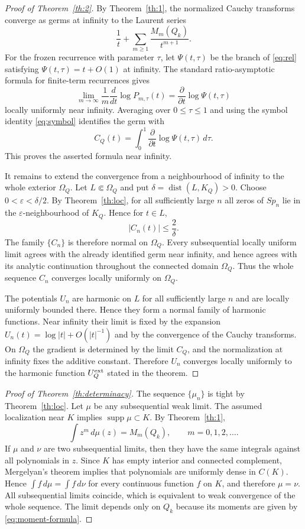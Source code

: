 \documentclass[10pt,twoside,a4paper,reqno]{amsart}
\theoremstyle{plain}
\theoremstyle{definition}
\theoremstyle{remark}
\begin{document}
\begin{proof}[Proof of Theorem~\ref{th:2}]
By Theorem~\ref{th:1}, the normalized Cauchy transforms converge as germs at
infinity to the Laurent series
\[
        \frac1t+\sum_{m\ge1}\frac{M_m(Q_k)}{t^{m+1}}.
\]
For the frozen recurrence with parameter $\tau$, let $\Psi(t,\tau)$ be the
branch of \eqref{eq:rel} satisfying $\Psi(t,\tau)=t+O(1)$ at infinity.  The
standard ratio-asymptotic formula for finite-term recurrences gives
\[
        \lim_{m\to\infty}\frac1m\frac{d}{dt}\log P_{m,\tau}(t)
        =\frac{\partial}{\partial t}\log\Psi(t,\tau)
\]
locally uniformly near infinity.  Averaging over $0\le\tau\le1$ and using the
symbol identity \eqref{eq:symbol} identifies the germ with
\[
        C_Q(t)=\int_0^1\frac{\partial}{\partial t}\log\Psi(t,\tau)\,d\tau .
\]
This proves the asserted formula near infinity.

It remains to extend the convergence from a neighbourhood of infinity to the
whole exterior $\Omega_Q$.  Let $L\Subset\Omega_Q$ and put
$\delta=\operatorname{dist}(L,K_Q)>0$.  Choose
$0<\varepsilon<\delta/2$.  By Theorem~\ref{th:loc}, for all sufficiently large
$n$ all zeros of $Sp_n$ lie in the $\varepsilon$-neighbourhood of $K_Q$.  Hence
for $t\in L$,
\[
        |C_n(t)|\le \frac{2}{\delta} .
\]
The family $\{C_n\}$ is therefore normal on $\Omega_Q$.  Every subsequential
locally uniform limit agrees with the already identified germ near infinity, and
hence agrees with its analytic continuation throughout the connected domain
$\Omega_Q$.  Thus the whole sequence $C_n$ converges locally uniformly on
$\Omega_Q$.

The potentials $U_n$ are harmonic on $L$ for all sufficiently large $n$ and are
locally uniformly bounded there.  Hence they form a normal family of harmonic
functions.  Near infinity their limit is fixed by the expansion
$U_n(t)=\log|t|+O(|t|^{-1})$ and by the convergence of the Cauchy transforms.
On $\Omega_Q$ the gradient is determined by the limit $C_Q$, and the
normalization at infinity fixes the additive constant.  Therefore $U_n$ converges
locally uniformly to the harmonic function $U_Q^{\rm ext}$ stated in the theorem.
\end{proof}

\begin{proof}[Proof of Theorem~\ref{th:determinacy}]
The sequence $\{\mu_n\}$ is tight by Theorem~\ref{th:loc}.  Let $\mu$ be any
subsequential weak limit.  The assumed localization near $K$ implies
$\operatorname{supp}\mu\subset K$.  By Theorem~\ref{th:1},
\[
        \int z^m\,d\mu(z)=M_m(Q_k),\qquad m=0,1,2,\ldots .
\]
If $\mu$ and $\nu$ are two subsequential limits, then they have the same
integrals against all polynomials in $z$.  Since $K$ has empty interior and
connected complement, Mergelyan's theorem implies that polynomials are uniformly
dense in $C(K)$.  Hence $\int f\,d\mu=\int f\,d\nu$ for every continuous function
$f$ on $K$, and therefore $\mu=\nu$.  All subsequential limits coincide, which is
equivalent to weak convergence of the whole sequence.  The limit depends only on
$Q_k$ because its moments are given by \eqref{eq:moment-formula}.
\end{proof}
\end{document}

